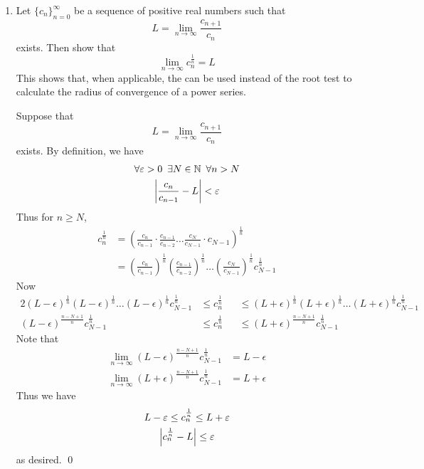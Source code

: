 \documentclass[notoc,notitlepage]{tufte-book}
\begin{document}
\begin{enumerate}
	\item Let $\{c_n\}_{n = 0}^\infty$ be a sequence of positive real numbers such that
		\begin{equation*}
			L = \lim_{n \to \infty} \frac{c_{n + 1}}{c_n}
		\end{equation*}
		exists. Then show that
		\begin{equation*}
			\lim_{n \to \infty} c_n^{\frac{1}{n}} = L
		\end{equation*}
		This shows that, when applicable, the  can be used instead of the root test to calculate the radius of convergence of a power series.

		\begin{solution}
			Suppose that
			\begin{equation*}
				L = \lim_{n \to \infty} \frac{c_{n + 1}}{c_n}
			\end{equation*}
			exists. By definition, we have
			\begin{gather*}
				\forall \varepsilon > 0 \enspace \exists N \in \mathbb{N} \enspace \forall n > N \\
				\left|\frac{c_n}{c_{n - 1}} - L\right| < \varepsilon
			\end{gather*}
			Thus for $n \geq N$,
			\begin{align*}
				c_n ^\frac{1}{n}
					&= \left(\frac{c_n}{c_{n - 1}} \cdot \frac{c_{n - 1}}{c_{n - 2}} \hdots \frac{c_N}{c_{N - 1}} \cdot c_{N - 1} \right)^\frac{1}{n} \\
					&= \left(\frac{c_n}{c_{n - 1}}\right)^\frac{1}{n} \left(\frac{c_{n - 1}}{c_{n - 2}} \right)^\frac{1}{n} \hdots \left(\frac{c_N}{c_{N - 1}} \right)^\frac{1}{n} c_{N - 1}^\frac{1}{n}
			\end{align*}
			Now
			\begin{alignat*}{2}
				(L - \epsilon)^\frac{1}{n} (L - \epsilon)^\frac{1}{n} \hdots (L - \epsilon)^\frac{1}{n}  c_{N - 1}^\frac{1}{n} &\leq c_n^\frac{1}{n} &&\leq (L + \epsilon)^\frac{1}{n} (L + \epsilon)^\frac{1}{n}  \hdots (L + \epsilon)^\frac{1}{n} c_{N - 1}^\frac{1}{n} \\
				(L - \epsilon)^\frac{n - N + 1}{n} c_{N - 1}^\frac{1}{n} &\leq c_n^\frac{1}{n} &&\leq (L + \epsilon)^\frac{n - N + 1}{n} c_{N - 1}^\frac{1}{n} 
			\end{alignat*}
			Note that
			\begin{align*}
				\lim_{n \to \infty} (L - \epsilon)^\frac{n - N + 1}{n} c_{N - 1}^\frac{1}{n} &= L - \epsilon \\
				\lim_{n \to \infty} (L + \epsilon)^\frac{n - N + 1}{n} c_{N - 1}^\frac{1}{n} &= L + \epsilon
			\end{align*}
			Thus we have
			\begin{gather*}
				L - \varepsilon \leq c_n^\frac{1}{n} \leq L + \varepsilon \\
				\left|c_n^\frac{1}{n} - L\right| \leq \varepsilon
			\end{gather*}
			as desired. \qed
		\end{solution}


\end{enumerate}
\end{document}
